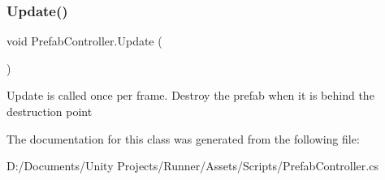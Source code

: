 \subsubsection{\texorpdfstring{Update()}{Update()}}
{\footnotesize\ttfamily void Prefab\+Controller.\+Update (\begin{DoxyParamCaption}{ }\end{DoxyParamCaption})\hspace{0.3cm}{\ttfamily [private]}}

Update is called once per frame. Destroy the prefab when it is behind the destruction point 

The documentation for this class was generated from the following file\+:\begin{DoxyCompactItemize}
\item 
D\+:/\+Documents/\+Unity Projects/\+Runner/\+Assets/\+Scripts/Prefab\+Controller.\+cs\end{DoxyCompactItemize}

